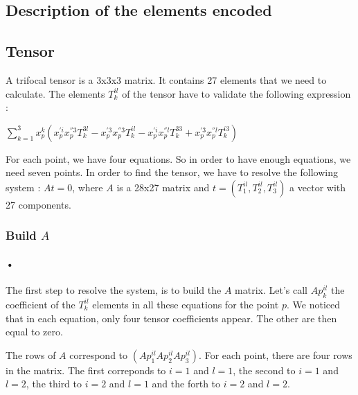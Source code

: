 \documentclass{report}
\begin{document}
\textcolor{title}{\section{Description of the elements encoded}}
\textcolor{subtitle}{\subsection{Tensor}}

A trifocal tensor is a 3x3x3 matrix. It contains 27 elements that we need to calculate. The elements $T_{k}^{il}$ of the tensor have to validate the following expression : 
\begin{center}
 $ \displaystyle { \sum_{k = 1}^{3}} x_{p}^{k}(x_{p}^{'i}x_{p}^{''3}T_{k}^{3l} - x_{p}^{'3}x_{p}^{''3}T_{k}^{il} - x_{p}^{'i}x_{p}^{''l}T_{k}^{33} + x_{p}^{'3}x_{p}^{''l}T_{k}^{i3})$ 
\end{center}
For each point, we have four equations. So in order to have enough equations, we need seven points. 
In order to find the tensor, we have to resolve the following system : $At = 0$, where $A$ is a 28x27 matrix and $t = ( T_{1}^{il}, T_{2}^{il}, T_{3}^{il})$ a vector with 27 components.

\subsubsection{Build $A$}
\paragraph{•}

The first step to resolve the system, is to build the $A$ matrix. Let's call $Ap_{k}^{il}$ the coefficient of the $T_{k}^{il}$ elements in all these equations for the point $p$. We noticed that in each equation, only four tensor coefficients appear. The other are then equal to zero. 

The rows of $A$ correspond to $( Ap_{1}^{il}  Ap_{2}^{il}  Ap_{3}^{il} )$.
For each point, there are four rows in the matrix. The first correponds to $i=1$ and $l=1$, the second to $i=1$ and $l=2$, the third to $i=2$ and $l=1$ and the forth to $i=2$ and $l=2$.
\end{document}
